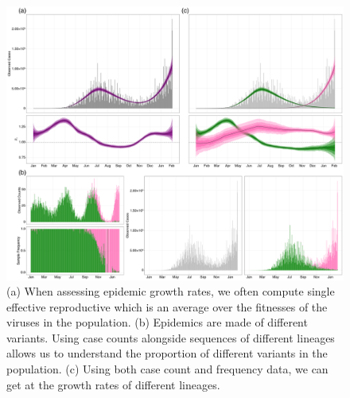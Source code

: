 \documentclass[12pt]{article}
\begin{document}
\begin{figure}
  \centering
  \includegraphics[width=\linewidth]{figs/fig_1.png}
  \caption{ (a) When assessing epidemic growth rates, we often compute single effective reproductive which is an average over the fitnesses of the viruses in the population.  (b) Epidemics are made of different variants. Using case counts alongside sequences of different lineages allows us to understand the proportion of different variants in the population. (c) Using both case count and frequency data, we can get at the growth rates of different lineages.}%
  \label{fig:1}
\end{figure}
\end{document}
